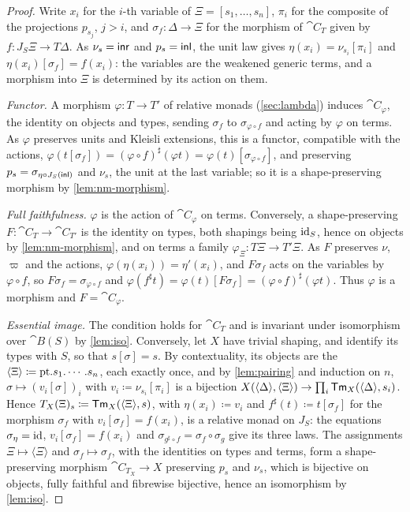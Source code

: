 \begin{proof}
    Write $x_i$ for the $i$-th variable of $\Xi = [s_1, \ldots, s_n]$, $\pi_i$ for the composite of the projections $p_{s_j}$, $j > i$, and $\sigma_f : \Delta \to \Xi$ for the morphism of $\cat{C}_T$ given by $f : J_S\Xi \to T\Delta$. As $\nu_s = \mathsf{inr}$ and $p_s = \mathsf{inl}$, the unit law gives $\eta(x_i) = \nu_{s_i}[\pi_i]$ and $\eta(x_i)[\sigma_f] = f(x_i)$: the variables are the weakened generic terms, and a morphism into $\Xi$ is determined by its action on them.

    \emph{Functor.} A morphism $\varphi : T \to T'$ of relative monads (\cref{sec:lambda}) induces $\cat{C}_\varphi$, the identity on objects and types, sending $\sigma_f$ to $\sigma_{\varphi \circ f}$ and acting by $\varphi$ on terms. As $\varphi$ preserves units and Kleisli extensions, this is a functor, compatible with the actions, $\varphi(t[\sigma_f]) = (\varphi \circ f)^\sharp(\varphi t) = \varphi(t)[\sigma_{\varphi \circ f}]$, and preserving $p_s = \sigma_{\eta \circ J_S(\mathsf{inl})}$ and $\nu_s$, the unit at the last variable; so it is a shape-preserving morphism by \cref{lem:nm-morphism}.

    \emph{Full faithfulness.} $\varphi$ is the action of $\cat{C}_\varphi$ on terms. Conversely, a shape-preserving $F : \cat{C}_T \to \cat{C}_{T'}$ is the identity on types, both shapings being $\mathrm{id}_S$, hence on objects by \cref{lem:nm-morphism}, and on terms a family $\varphi_\Xi : T\Xi \to T'\Xi$. As $F$ preserves $\nu$, $\varpi$ and the actions, $\varphi(\eta(x_i)) = \eta'(x_i)$, and $F\sigma_f$ acts on the variables by $\varphi \circ f$, so $F\sigma_f = \sigma_{\varphi \circ f}$ and $\varphi(f^\sharp t) = \varphi(t)[F\sigma_f] = (\varphi \circ f)^\sharp(\varphi t)$. Thus $\varphi$ is a morphism and $F = \cat{C}_\varphi$.

    \emph{Essential image.} The condition holds for $\cat{C}_T$ and is invariant under isomorphism over $\cat{B}(S)$ by \cref{lem:iso}. Conversely, let $X$ have trivial shaping, and identify its types with $S$, so that $s[\sigma] = s$. By contextuality, its objects are the $\langle \Xi \rangle \coloneqq \mathrm{pt}.s_1.\cdots.s_n$, each exactly once, and by \cref{lem:pairing} and induction on $n$, $\sigma \mapsto (v_i[\sigma])_i$ with $v_i \coloneqq \nu_{s_i}[\pi_i]$ is a bijection $X(\langle \Delta \rangle, \langle \Xi \rangle) \to \prod_i \mathsf{Tm}_X(\langle \Delta \rangle, s_i)$. Hence $T_X(\Xi)_s \coloneqq \mathsf{Tm}_X(\langle \Xi \rangle, s)$, with $\eta(x_i) \coloneqq v_i$ and $f^\sharp(t) \coloneqq t[\sigma_f]$ for the morphism $\sigma_f$ with $v_i[\sigma_f] = f(x_i)$, is a relative monad on $J_S$: the equations $\sigma_\eta = \mathrm{id}$, $v_i[\sigma_f] = f(x_i)$ and $\sigma_{g^\sharp \circ f} = \sigma_f \circ \sigma_g$ give its three laws. The assignments $\Xi \mapsto \langle \Xi \rangle$ and $\sigma_f \mapsto \sigma_f$, with the identities on types and terms, form a shape-preserving morphism $\cat{C}_{T_X} \to X$ preserving $p_s$ and $\nu_s$, which is bijective on objects, fully faithful and fibrewise bijective, hence an isomorphism by \cref{lem:iso}.
\end{proof}

